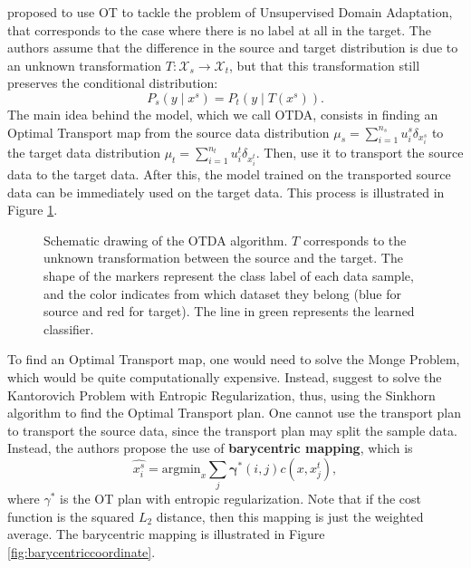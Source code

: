 \citet{courty2014domain} proposed to use OT to tackle the problem of Unsupervised Domain Adaptation,
that corresponds to the case where there is no label at all in the target.
The authors assume that the difference in the source and target distribution is due to an
unknown transformation $T:\mathcal X_s \to \mathcal X_t$, but that this transformation
still preserves the conditional distribution:
\begin{equation}
  P_s(y \mid x^{s}) = P_t(y \mid T(x^{s})).
\end{equation}
The main idea behind the model, which we call OTDA, consists in finding an Optimal Transport map
from the source data distribution
$\mu_s = \sum^{n_s}_{i=1}u_i^{s} \delta_{x^s_i}$ to the target data distribution
$\mu_t = \sum^{n_t}_{i=1}u_i^{t} \delta_{x^t_i}$. Then, use it to transport the source data
to the target data. After this, the model trained on the transported source data can
be immediately used on the target data. This process is illustrated in Figure \ref{fig:otda}.

\begin{figure}[H]
  \centering
  \def\svgscale{0.8}
  
	\caption{Schematic drawing of the OTDA algorithm. $T$ corresponds to the unknown transformation
  between the source and the target.
  The shape of the markers represent the class label of each data sample, and the color indicates from which dataset
  they belong (blue for source and red for target). The line in green represents the learned classifier.}
	\label{fig:otda}
\end{figure}

To find an Optimal Transport map, one would need to solve the Monge Problem, which would be quite computationally
expensive. Instead, \citet{courty2014domain} suggest to solve the Kantorovich Problem with Entropic Regularization,
thus, using the Sinkhorn algorithm to find the Optimal Transport plan.
One cannot use the transport plan to transport the source data,
since the transport plan may split the sample data. Instead, the authors propose the use of \textbf{barycentric mapping},
which is
\begin{equation}
  \hat{x^s_i} = \mathrm{argmin}_x \sum_j \bm \gamma^*(i,j) c(x,x_j^t),
  \label{eq:barycentricmapping}
\end{equation}
where $\gamma^*$ is the OT plan with entropic regularization. Note that if the cost function
is the squared $L_2$ distance, then this mapping is just the weighted average. The barycentric
mapping is illustrated in Figure \ref{fig:barycentriccoordinate}.

